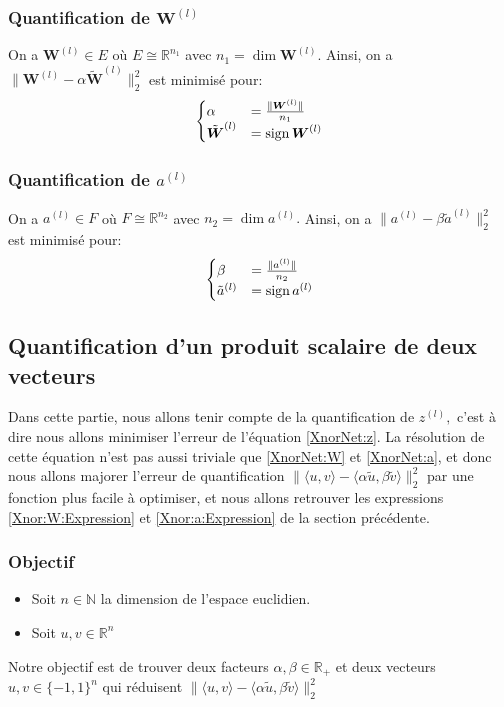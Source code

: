 \subsubsection{Quantification de $\boldsymbol{W}^{(l)}$}
On a $\boldsymbol{W}^{(l)} \in E$ où $E\cong \mathbb{R}^{n_1}$ avec $n_1=\dim \boldsymbol{W}^{(l)}.$
\newline Ainsi, on a $\lVert \boldsymbol{W}^{(l)} - \alpha \tilde{\boldsymbol{W}}^{(l)} \rVert_2^2$ est minimisé pour:
\begin{equation}\label{Xnor:W:Expression}
	\begin{cases}
		\alpha &= \frac{\lVert \boldsymbol{W}^{(l)} \rVert }{n_1} \\ 
		\tilde{\boldsymbol{W}}^{(l)} &=\operatorname{sign} \boldsymbol{W}^{(l)}
	\end{cases}
\end{equation}
\subsubsection{Quantification de $a^{(l)}$}
On a $a^{(l)} \in F$ où $F\cong \mathbb{R}^{n_2}$ avec $n_2=\dim a^{(l)}.$
\newline Ainsi, on a $\lVert a^{(l)} - \beta \tilde{a}^{(l)} \rVert_2^2$ est minimisé pour:
\begin{equation}\label{Xnor:a:Expression}
	\begin{cases}
		\beta &= \frac{\lVert a^{(l)} \rVert }{n_2} \\ 
		\tilde{a}^{(l)} &=\operatorname{sign} a^{(l)}
	\end{cases}
\end{equation}

\subsection{Quantification d'un produit scalaire de deux vecteurs}\label{XnorNet:InnerProductQuantification}
Dans cette partie, nous allons tenir compte de la quantification de $z^{(l)},$ c'est à dire nous allons minimiser l'erreur de l'équation \eqref{XnorNet:z}.
\newline La résolution de cette équation n'est pas aussi triviale que \eqref{XnorNet:W}  et \eqref{XnorNet:a}, et donc nous allons majorer l'erreur de quantification $\lVert \langle  u,v \rangle - \langle  \alpha \tilde u,\beta \tilde v \rangle \rVert_2^2$ par une fonction plus facile à optimiser, et nous allons retrouver les expressions \eqref{Xnor:W:Expression} et \eqref{Xnor:a:Expression} de la section précédente.
\subsubsection{Objectif}
\begin{itemize}
\item Soit $n\in\mathbb{N}$ la dimension de l'espace euclidien.
\item Soit $u,v\in\mathbb{R}^n$  
\end{itemize}
Notre objectif est de trouver deux facteurs $\alpha,\beta \in\mathbb{R}_+$ et deux vecteurs $u,v\in\{-1,1\}^n$ qui réduisent $\lVert \langle  u,v \rangle - \langle  \alpha \tilde u,\beta \tilde v \rangle \rVert_2^2$
